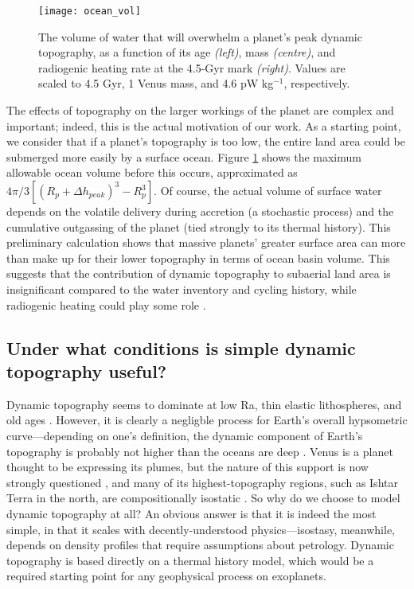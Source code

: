 \begin{figure}
  \centering
  \texttt{[image: ocean\_vol]}
\caption{The volume of water that will overwhelm a planet's peak dynamic topography, as a function of its age \textit{(left)}, mass \textit{(centre)}, and radiogenic heating rate at the 4.5-Gyr mark \textit{(right)}. Values are scaled to 4.5 Gyr, 1 Venus mass, and 4.6 pW kg$^{-1}$, respectively.}
\label{fig:ocean}
\end{figure}

The effects of topography on the larger workings of the planet are complex and important; indeed, this is the actual motivation of our work. As a starting point, we consider that if a planet's topography is too low, the entire land area could be submerged more easily by a surface ocean. Figure \ref{fig:ocean} shows the maximum allowable ocean volume before this occurs, approximated as $4\pi/3 \left[(R_p + \Delta h_{peak} )^3 - R_p^3\right]$. Of course, the actual volume of surface water depends on the volatile delivery during accretion (a stochastic process) and the cumulative outgassing of the planet (tied strongly to its thermal history). This preliminary calculation shows that massive planets' greater surface area can more than make up for their lower topography in terms of ocean basin volume. This suggests that the contribution of dynamic topography to subaerial land area is insignificant compared to the water inventory and cycling history, while radiogenic heating could play some role \citep[cf.][]{Komacek2016}.



\subsection{Under what conditions is simple dynamic topography useful?}

Dynamic topography seems to dominate at low Ra, thin elastic lithospheres, and old ages \citep{Breuer2015}. However, it is clearly a negligble process for Earth's overall hypsometric curve---depending on one's definition, the dynamic component of Earth's topography is probably not higher than the oceans are deep \citep{Molnar2015, Hoggard2016}. Venus is a planet thought to be expressing its plumes, but the nature of this support is now strongly questioned \citep{Orth2011}, and many of its highest-topography regions, such as Ishtar Terra in the north, are compositionally isostatic \citep{Grimm1991, Yang2016}. So why do we choose to model dynamic topography at all? An obvious answer is that it is indeed the most simple, in that it scales with decently-understood physics---isostasy, meanwhile, depends on density profiles that require assumptions about petrology. Dynamic topography is based directly on a thermal history model, which would be a required starting point for any geophysical process on exoplanets.

